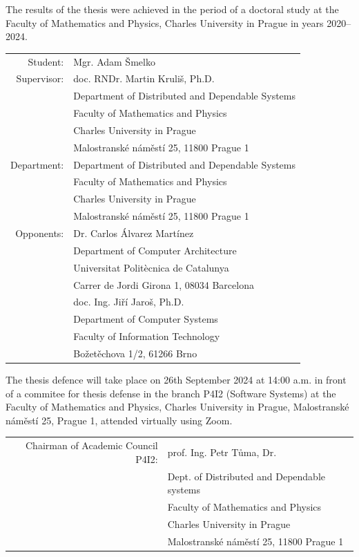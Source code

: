 {
\small
\setlength\parindent{0mm}
\setlength\parskip{2pt}
The results of the thesis were achieved in the period of a doctoral study at
the Faculty of Mathematics and Physics, Charles University in Prague in years
2020--2024.

\begin{center}
\begin{tabular}{rl}
Student:
 & Mgr. Adam Šmelko \\
Supervisor:
 & doc. RNDr. Martin Kruliš, Ph.D. \\
 & Department of Distributed and Dependable Systems \\
 & Faculty of Mathematics and Physics \\
 & Charles University in Prague \\
 & Malostranské náměstí 25, 11800 Prague 1 \\
\addlinespace
Department:
 & Department of Distributed and Dependable Systems \\
 & Faculty of Mathematics and Physics \\
 & Charles University in Prague \\
 & Malostranské náměstí 25, 11800 Prague 1 \\
\addlinespace
Opponents:
 & Dr. Carlos Álvarez Martínez \\
 & Department of Computer Architecture \\
 & Universitat Politècnica de Catalunya  \\
 & Carrer de Jordi Girona 1, 08034 Barcelona \\
 \addlinespace
 & doc. Ing. Jiří Jaroš, Ph.D. \\
 & Department of Computer Systems \\
 & Faculty of Information Technology \\
 & Božetěchova 1/2, 61266 Brno \\
\end{tabular}
\end{center}

The thesis defence will take place on 26th September 2024 at 14:00 a.m. in front
of a commitee for thesis defense in the branch P4I2 (Software Systems) at the
Faculty of Mathematics and Physics, Charles University in Prague, Malostranské
náměstí 25, Prague 1, attended virtually using Zoom.

\begin{center}
\begin{tabular}{rl}
Chairman of Academic Council P4I2: \hspace{-0.5em}
 & prof. Ing. Petr Tůma, Dr.\\
 & Dept. of Distributed and Dependable systems\\
 & Faculty of Mathematics and Physics\\
 & Charles University in Prague\\
 & Malostranské náměstí 25, 11800 Prague 1\\
\end{tabular}
\end{center}

}
